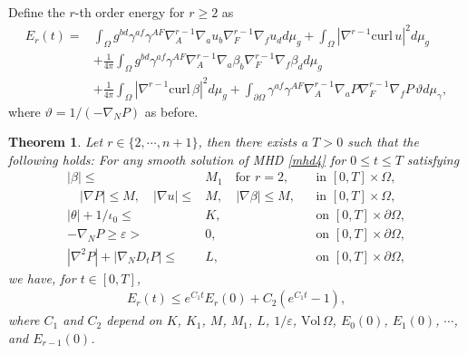 \documentclass[12pt,reqno]{amsart}
\numberwithin{equation}{section}
\newtheorem{theorem}{Theorem}[section]
\theoremstyle{definition}
\theoremstyle{remark}
\begin{document}
Define the $r$-th order energy for $r{\geqslant} 2$ as
\begin{align*}
  E_r(t)=&\int_\Omega g^{bd}\gamma^{af}\gamma^{AF}{\nabla}_A^{r-1}{\nabla}_a u_b{\nabla}_F^{r-1}{\nabla}_f u_d d\mu_g+\int_\Omega |{\nabla}^{r-1}{\mathrm{curl}\,} u|^2 d\mu_g\\
  &+\frac{1}{4\pi}\int_\Omega g^{bd}\gamma^{af}\gamma^{AF}{\nabla}_A^{r-1}{\nabla}_a \beta_b{\nabla}_F^{r-1}{\nabla}_f \beta_d d\mu_g\\
  &+\frac{1}{4\pi}\int_\Omega |{\nabla}^{r-1}{\mathrm{curl}\,} \beta|^2 d\mu_g+\int_{{\partial}\Omega} \gamma^{af}\gamma^{AF}{\nabla}_A^{r-1}{\nabla}_a {P }{\nabla}_F^{r-1}{\nabla}_f {P }\, \vartheta d\mu_\gamma,
\end{align*}
where $\vartheta=1/(-{\nabla}_N {P })$ as before.

\begin{theorem}\label{thm.renergy}
  Let $r\in \{2,\cdots,n+1\}$, then there exists a $T>0$ such that the following holds: For any smooth solution of MHD \eqref{mhd4} for $0{\leqslant} t{\leqslant} T$ satisfying
  \begin{align}
   |\beta|{\leqslant}& M_1 \quad\text{for } r=2,&&\text{in } [0,T]\times \Omega,\label{eq.2energy81}\\
   \quad |{\nabla} {P }|{\leqslant} M, \quad |{\nabla} u|{\leqslant}& M, \quad |{\nabla} \beta|{\leqslant} M,  &&\text{in } [0,T]\times \Omega,\label{eq.2energy8}\\
    |\theta|+1/\iota_0{\leqslant} &K,&&\text{on } [0,T]\times {\partial}\Omega,\label{eq.2energy9}\\
    -{\nabla}_N {P }{\geqslant} {\varepsilon}>&0, &&\text{on } [0,T]\times {\partial}\Omega,\label{eq.2energy91}\\
    |{\nabla}^2{P }|+|{\nabla}_ND_t{P }|{\leqslant}& L,&&\text{on } [0,T]\times {\partial}\Omega,\label{eq.2energy92}
  \end{align}
  we have, for $t\in[0,T]$,
  \begin{align}\label{eq.renergy}
  E_r(t){\leqslant} e^{C_1t}E_r(0)+C_2\left(e^{C_1t}-1\right),
\end{align}
where $C_1$ and $C_2$ depend on $K$, $K_1$, $M$, $M_1$, $L$, $1/{\varepsilon}$, ${\mathrm{Vol}\,}\Omega$, $E_0(0)$, $E_1(0)$, $\cdots$, and $E_{r-1}(0)$.
\end{theorem}
\end{document}
